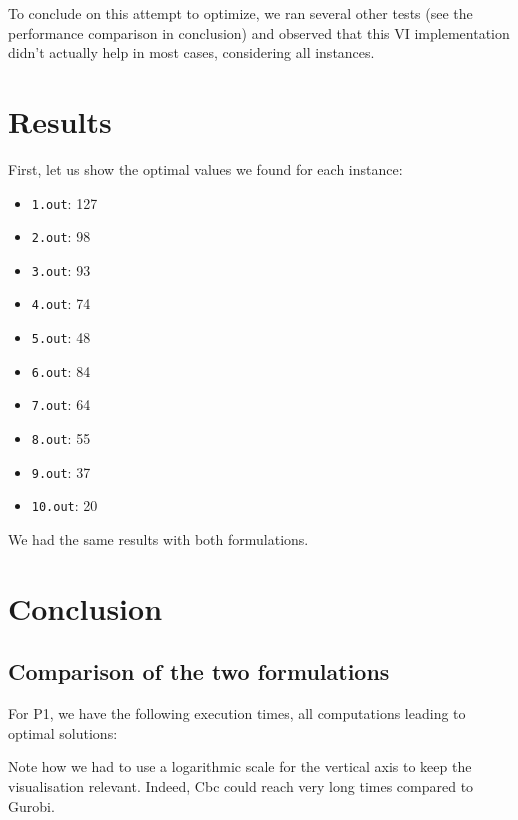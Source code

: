 \documentclass[a4paper,10pt]{article}
\begin{document}
To conclude on this attempt to optimize, we ran several other tests (see the performance comparison in conclusion) and observed that this VI implementation didn't actually help in most cases, considering all instances.




\section{Results}

First, let us show the optimal values we found for each instance:
\begin{itemize}
	\item \texttt{1.out}: 127
	\item \texttt{2.out}: 98
	\item \texttt{3.out}: 93
	\item \texttt{4.out}: 74
	\item \texttt{5.out}: 48
	\item \texttt{6.out}: 84
	\item \texttt{7.out}: 64
	\item \texttt{8.out}: 55
	\item \texttt{9.out}: 37
	\item \texttt{10.out}: 20
\end{itemize}

We had the same results with both formulations.


\section{Conclusion}
	\subsection{Comparison of the two formulations}
	
	For P1, we have the following execution times, all computations leading to optimal solutions:


Note how we had to use a logarithmic scale for the vertical axis to keep the visualisation relevant. Indeed, Cbc could reach very long times compared to Gurobi.
\end{document}
